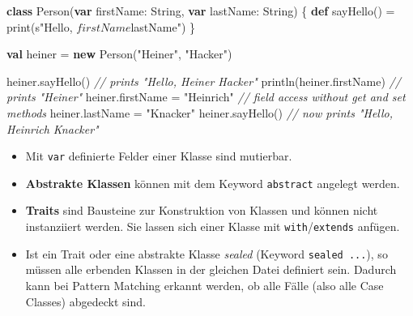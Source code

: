 \documentclass[]{article}
\newenvironment{Shaded}{}{}
\newcommand{\CommentTok}[1]{\textcolor[rgb]{0.38,0.63,0.69}{\textit{#1}}}
\newcommand{\FunctionTok}[1]{\textcolor[rgb]{0.02,0.16,0.49}{#1}}
\newcommand{\KeywordTok}[1]{\textcolor[rgb]{0.00,0.44,0.13}{\textbf{#1}}}
\newcommand{\NormalTok}[1]{#1}
\newcommand{\StringTok}[1]{\textcolor[rgb]{0.25,0.44,0.63}{#1}}
\providecommand{\tightlist}{%
  \setlength{\itemsep}{0pt}\setlength{\parskip}{0pt}}
\begin{document}
\begin{Shaded}
\begin{Highlighting}[]
\KeywordTok{class} \FunctionTok{Person}\NormalTok{(}\KeywordTok{var}\NormalTok{ firstName: String, }\KeywordTok{var}\NormalTok{ lastName: String) \{}
  \KeywordTok{def} \FunctionTok{sayHello}\NormalTok{() = }\FunctionTok{print}\NormalTok{(s}\StringTok{"Hello, $firstName $lastName"}\NormalTok{)}
\NormalTok{\}}

\KeywordTok{val}\NormalTok{ heiner = }\KeywordTok{new} \FunctionTok{Person}\NormalTok{(}\StringTok{"Heiner"}\NormalTok{, }\StringTok{"Hacker"}\NormalTok{)}

\NormalTok{heiner.}\FunctionTok{sayHello}\NormalTok{() }\CommentTok{// prints "Hello, Heiner Hacker"}
\FunctionTok{println}\NormalTok{(heiner.}\FunctionTok{firstName}\NormalTok{) }\CommentTok{// prints "Heiner"}
\NormalTok{heiner.}\FunctionTok{firstName}\NormalTok{ = }\StringTok{"Heinrich"} \CommentTok{// field access without get and set methods}
\NormalTok{heiner.}\FunctionTok{lastName}\NormalTok{ = }\StringTok{"Knacker"}
\NormalTok{heiner.}\FunctionTok{sayHello}\NormalTok{() }\CommentTok{// now prints "Hello, Heinrich Knacker"}
\end{Highlighting}
\end{Shaded}

\begin{itemize}
\tightlist
\item
  Mit \texttt{var} definierte Felder einer Klasse sind mutierbar.
\item
  \textbf{Abstrakte Klassen} können mit dem Keyword \texttt{abstract}
  angelegt werden.
\item
  \textbf{Traits} sind Bausteine zur Konstruktion von Klassen und können
  nicht instanziiert werden. Sie lassen sich einer Klasse mit
  \texttt{with}/\texttt{extends} anfügen.
\item
  Ist ein Trait oder eine abstrakte Klasse \emph{sealed} (Keyword
  \texttt{sealed\ ...}), so müssen alle erbenden Klassen in der gleichen
  Datei definiert sein. Dadurch kann bei Pattern Matching erkannt
  werden, ob alle Fälle (also alle Case Classes) abgedeckt sind.
\end{itemize}
\end{document}

